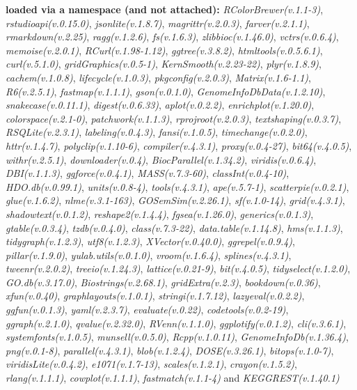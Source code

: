 \documentclass[
]{book}
\begin{document}
\textbf{loaded via a namespace (and not attached):}
\emph{RColorBrewer(v.1.1-3)}, \emph{rstudioapi(v.0.15.0)}, \emph{jsonlite(v.1.8.7)}, \emph{magrittr(v.2.0.3)}, \emph{farver(v.2.1.1)}, \emph{rmarkdown(v.2.25)}, \emph{ragg(v.1.2.6)}, \emph{fs(v.1.6.3)}, \emph{zlibbioc(v.1.46.0)}, \emph{vctrs(v.0.6.4)}, \emph{memoise(v.2.0.1)}, \emph{RCurl(v.1.98-1.12)}, \emph{ggtree(v.3.8.2)}, \emph{htmltools(v.0.5.6.1)}, \emph{curl(v.5.1.0)}, \emph{gridGraphics(v.0.5-1)}, \emph{KernSmooth(v.2.23-22)}, \emph{plyr(v.1.8.9)}, \emph{cachem(v.1.0.8)}, \emph{lifecycle(v.1.0.3)}, \emph{pkgconfig(v.2.0.3)}, \emph{Matrix(v.1.6-1.1)}, \emph{R6(v.2.5.1)}, \emph{fastmap(v.1.1.1)}, \emph{gson(v.0.1.0)}, \emph{GenomeInfoDbData(v.1.2.10)}, \emph{snakecase(v.0.11.1)}, \emph{digest(v.0.6.33)}, \emph{aplot(v.0.2.2)}, \emph{enrichplot(v.1.20.0)}, \emph{colorspace(v.2.1-0)}, \emph{patchwork(v.1.1.3)}, \emph{rprojroot(v.2.0.3)}, \emph{textshaping(v.0.3.7)}, \emph{RSQLite(v.2.3.1)}, \emph{labeling(v.0.4.3)}, \emph{fansi(v.1.0.5)}, \emph{timechange(v.0.2.0)}, \emph{httr(v.1.4.7)}, \emph{polyclip(v.1.10-6)}, \emph{compiler(v.4.3.1)}, \emph{proxy(v.0.4-27)}, \emph{bit64(v.4.0.5)}, \emph{withr(v.2.5.1)}, \emph{downloader(v.0.4)}, \emph{BiocParallel(v.1.34.2)}, \emph{viridis(v.0.6.4)}, \emph{DBI(v.1.1.3)}, \emph{ggforce(v.0.4.1)}, \emph{MASS(v.7.3-60)}, \emph{classInt(v.0.4-10)}, \emph{HDO.db(v.0.99.1)}, \emph{units(v.0.8-4)}, \emph{tools(v.4.3.1)}, \emph{ape(v.5.7-1)}, \emph{scatterpie(v.0.2.1)}, \emph{glue(v.1.6.2)}, \emph{nlme(v.3.1-163)}, \emph{GOSemSim(v.2.26.1)}, \emph{sf(v.1.0-14)}, \emph{grid(v.4.3.1)}, \emph{shadowtext(v.0.1.2)}, \emph{reshape2(v.1.4.4)}, \emph{fgsea(v.1.26.0)}, \emph{generics(v.0.1.3)}, \emph{gtable(v.0.3.4)}, \emph{tzdb(v.0.4.0)}, \emph{class(v.7.3-22)}, \emph{data.table(v.1.14.8)}, \emph{hms(v.1.1.3)}, \emph{tidygraph(v.1.2.3)}, \emph{utf8(v.1.2.3)}, \emph{XVector(v.0.40.0)}, \emph{ggrepel(v.0.9.4)}, \emph{pillar(v.1.9.0)}, \emph{yulab.utils(v.0.1.0)}, \emph{vroom(v.1.6.4)}, \emph{splines(v.4.3.1)}, \emph{tweenr(v.2.0.2)}, \emph{treeio(v.1.24.3)}, \emph{lattice(v.0.21-9)}, \emph{bit(v.4.0.5)}, \emph{tidyselect(v.1.2.0)}, \emph{GO.db(v.3.17.0)}, \emph{Biostrings(v.2.68.1)}, \emph{gridExtra(v.2.3)}, \emph{bookdown(v.0.36)}, \emph{xfun(v.0.40)}, \emph{graphlayouts(v.1.0.1)}, \emph{stringi(v.1.7.12)}, \emph{lazyeval(v.0.2.2)}, \emph{ggfun(v.0.1.3)}, \emph{yaml(v.2.3.7)}, \emph{evaluate(v.0.22)}, \emph{codetools(v.0.2-19)}, \emph{ggraph(v.2.1.0)}, \emph{qvalue(v.2.32.0)}, \emph{RVenn(v.1.1.0)}, \emph{ggplotify(v.0.1.2)}, \emph{cli(v.3.6.1)}, \emph{systemfonts(v.1.0.5)}, \emph{munsell(v.0.5.0)}, \emph{Rcpp(v.1.0.11)}, \emph{GenomeInfoDb(v.1.36.4)}, \emph{png(v.0.1-8)}, \emph{parallel(v.4.3.1)}, \emph{blob(v.1.2.4)}, \emph{DOSE(v.3.26.1)}, \emph{bitops(v.1.0-7)}, \emph{viridisLite(v.0.4.2)}, \emph{e1071(v.1.7-13)}, \emph{scales(v.1.2.1)}, \emph{crayon(v.1.5.2)}, \emph{rlang(v.1.1.1)}, \emph{cowplot(v.1.1.1)}, \emph{fastmatch(v.1.1-4)} and \emph{KEGGREST(v.1.40.1)}
\end{document}
